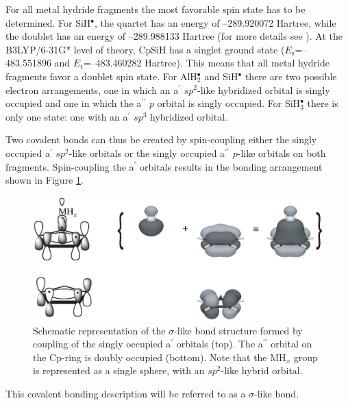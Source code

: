 For all metal hydride fragments the most favorable spin state has to be determined. For SiH$^\bullet$, the quartet has an energy of \mbox{--289.920072} Hartree, while the doublet has an energy of \mbox{--289.988133} Hartree (for more details see \cite{kalemos}). At the B3LYP/6-31G* level of theory, CpSiH has a singlet ground state ($E_\mathrm{s}$=\mbox{--483.551896} and $E_\mathrm{t}$=\mbox{--483.460282} Hartree). This means that all metal hydride fragments favor a doublet spin state. For AlH$_2^\bullet$ and SiH$^\bullet$ there are two possible electron arrangements, one in which an a$^\prime$ $sp^2$-like hybridized orbital is singly occupied and one in which the a$^{\prime\prime}$ $p$ orbital is singly occupied. For SiH$_3^\bullet$ there is only one state: one with an a$^\prime$ $sp^3$ hybridized orbital. 

Two covalent bonds can thus be created by spin-coupling either the singly occupied a$^\prime$ $sp^2$-like orbitals or the singly occupied a$^{\prime\prime}$ $p$-like orbitals on both fragments. Spin-coupling the a$^\prime$ orbitals results in the bonding arrangement shown in Figure \ref{ch4.fig.sigma}.
\begin{figure}[htbp]
\center
\includegraphics[scale=0.45]{cyclopentadienyl/figures/sigma.eps}
\caption{Schematic representation of the $\sigma$-like bond structure formed by coupling of the singly occupied a$^\prime$ orbitals (top). The a$^{\prime\prime}$ orbital on the Cp-ring is doubly occupied (bottom). Note that the MH$_x$ group is represented as a single sphere, with an $sp^2$-like hybrid orbital.}
\label{ch4.fig.sigma}
\end{figure}
This covalent bonding description will be referred to as a $\sigma$-like bond.

